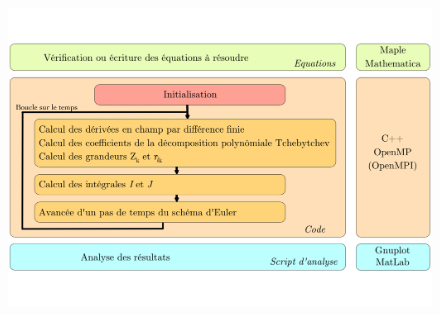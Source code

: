 \documentclass[9pt]{beamer}
\begin{document}
\begin{frame}
	\justifying
	\begin{figure}[H]
	\begin{center}
		\includegraphics[scale = 0.35]{Diagramme_Code_2_Bis.pdf}
	\label{fig:schemaIsing}
	\end{center}
\end{figure}
		

\end{frame}	
		
\end{document}
